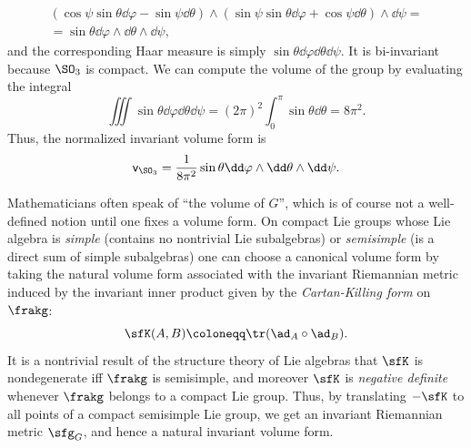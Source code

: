 \begin{example}
\begin{multline}
        (\cos\psi\sin\theta\dd\varphi-\sin\psi\dd\theta)\wedge (\sin\psi\sin\theta\dd\varphi+\cos\psi\dd\theta)\wedge\dd\psi=\\
        =\sin\theta\dd\varphi\wedge \dd\theta\wedge \dd\psi,
    \end{multline}
    and the corresponding Haar measure is simply $\sin\theta\dd\varphi\dd\theta\dd\psi$. It is bi-invariant because $\SO_3$ is compact. We can compute the volume of the group by evaluating the integral
    \[\iiint \sin\theta\dd\varphi\dd\theta\dd\psi=(2\pi)^2\int_0^\pi\sin\theta\dd\theta=8\pi^2.\]
    Thus, the normalized invariant volume form is
    \[\mathsf{v}_{\SO_3}=\frac{1}{8\pi^2}\sin\theta\dd\varphi\wedge \dd\theta\wedge \dd\psi.\]
\end{example}

\begin{rem}\label{rem killing form}
    Mathematicians often speak of ``the volume of $G$'', which is of course not a well-defined notion until one fixes a volume form. On compact Lie groups whose Lie algebra is \emph{simple} (contains no nontrivial Lie subalgebras) or \emph{semisimple} (is a direct sum of simple subalgebras) one can choose a canonical volume form by taking the natural volume form associated with the invariant Riemannian metric induced by the invariant inner product given by the \emph{Cartan-Killing form} on $\frakg$: \[\sfK(A,B)\coloneqq \tr(\ad_A\circ \ad_B).\] 
    It is a nontrivial result of the structure theory of Lie algebras that $\sfK$ is nondegenerate iff $\frakg$ is semisimple, and moreover $\sfK$ is \emph{negative definite} whenever $\frakg$ belongs to a compact Lie group. Thus, by translating $-\sfK$ to all points of a compact semisimple Lie group, we get an invariant Riemannian metric $\sfg_G$, and hence a natural invariant volume form.
\end{rem}

